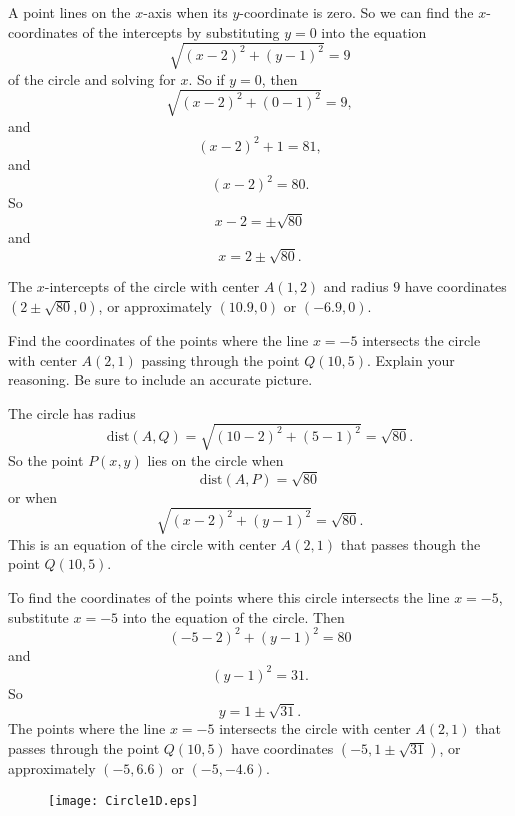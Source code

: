\documentclass{ximera}
\begin{document}
\begin{explanation}
\begin{onlineOnly}
    \begin{center}
\end{center}
\end{onlineOnly}

A point lines on the $x$-axis when its $y$-coordinate is zero. So we can find the $x$-coordinates of the intercepts by substituting $y=0$ into the equation
\[
\sqrt{(x-2)^2 + (y-1)^2} = 9 
\]
of the circle and solving for $x$. So if $y=0$, then
\[
\sqrt{(x-2)^2 + (0-1)^2} = 9,
\]
and
\[
   (x-2)^2 + 1 = 81,
\]
and
\[
   (x-2)^2 = 80.
\]
So
\[
    x-2 = \pm \sqrt{80}
\]
and 
\[
  x = 2\pm \sqrt{80} .
\]

The $x$-intercepts of the circle with center $A(1,2)$ and radius $9$ have coordinates $(2\pm \sqrt{80}, 0)$, or approximately $(10.9,0)$ or $(-6.9,0)$.




\iffalse   %

\begin{figure}[!h]
\centerline{
\texttt{[image: Circle1C.eps]}   
}
\end{figure}

\fi  %


\end{explanation}


\iffalse        %

\begin{example}  \label{Ex4}
Find the coordinates of the points where the line $x=-5$ intersects the circle with center $A(2,1)$ passing through the point $Q(10,5)$. Explain your reasoning. Be sure to include an accurate picture.
\end{example}

\begin{explanation}
The circle has radius
\[
   \text{dist}(A,Q) = \sqrt{(10-2)^2  + (5-1)^2} = \sqrt{80} .
\]
So the point $P(x,y)$ lies on the circle when
\[
  \text{dist}(A,P) = \sqrt{80}
\]
or when
\[
   \sqrt{(x-2)^2 +(y-1)^2} = \sqrt{80} .
\]
This is an equation of the circle with center $A(2,1)$ that passes though the point $Q(10,5)$.

To find the coordinates of the points where this circle intersects the line $x=-5$, substitute $x=-5$ into the equation of the circle. Then 
\[
       (-5-2)^2 + (y-1)^2 = 80
\]
and
\[ 
     (y-1)^2 = 31 .
\]
So
\[
     y = 1 \pm \sqrt{31} .
\]
The points where the line $x=-5$ intersects the circle with center $A(2,1)$ that passes through the point $Q(10,5)$ have coordinates $(-5, 1\pm \sqrt{31})$, or approximately $(-5, 6.6)$ or $(-5,-4.6)$.


\begin{figure}[!h]
\centerline{
\texttt{[image: Circle1D.eps]}   
}
\end{figure}


\end{explanation}
\end{document}
